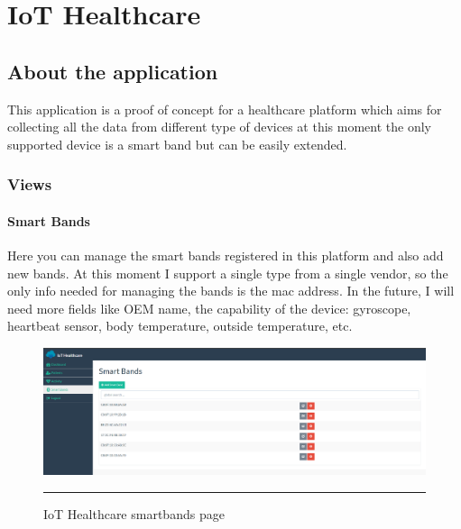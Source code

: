 
\chapter{IoT Healthcare} %

\label{IoT Healthcare} %


\section{About the application}

This application is a proof of concept for a healthcare platform which aims for collecting all the data from different type of devices at this moment the only supported device is a smart band but can be easily extended.

\subsection{Views}

\subsubsection*{Smart Bands}
Here you can manage the smart bands registered in this platform and also add new bands. At this moment I support a single type from a single vendor, so the only info needed for managing the bands is the mac address. In the future, I will need more fields like OEM name, the capability of the device: gyroscope, heartbeat sensor, body temperature,  outside temperature, etc.
\begin{figure}[h!]
	\centering
	\includegraphics[width=1\textwidth]{./images/iothsmartbands}
	\rule{1\textwidth}{1pt}
	\caption{IoT Healthcare smartbands page}
\end{figure}


